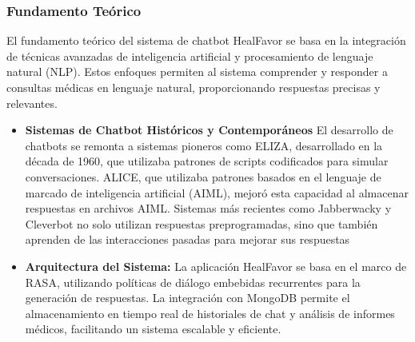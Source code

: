 \subsubsection{Fundamento Teórico}
El fundamento teórico del sistema de chatbot HealFavor se basa en la integración de técnicas avanzadas de inteligencia artificial y procesamiento de lenguaje natural (NLP). Estos enfoques permiten al sistema comprender y responder a consultas médicas en lenguaje natural, proporcionando respuestas precisas y relevantes.

\begin{itemize}
	
	\item \textbf{ Sistemas de Chatbot Históricos y Contemporáneos}
		El desarrollo de chatbots se remonta a sistemas pioneros como ELIZA, desarrollado en la década de 1960, que utilizaba patrones de scripts codificados para simular conversaciones. ALICE, que utilizaba patrones basados en el lenguaje de marcado de inteligencia artificial (AIML), mejoró esta capacidad al almacenar respuestas en archivos AIML. Sistemas más recientes como Jabberwacky y Cleverbot no solo utilizan respuestas preprogramadas, sino que también aprenden de las interacciones pasadas para mejorar sus respuestas
	
	\item \textbf{Arquitectura del Sistema:} La aplicación HealFavor se basa en el marco de RASA, utilizando políticas de diálogo embebidas recurrentes para la generación de respuestas. La integración con MongoDB permite el almacenamiento en tiempo real de historiales de chat y análisis de informes médicos, facilitando un sistema escalable y eficiente.
	\end{itemize}
